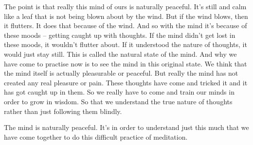 The point is that really this mind of ours is naturally peaceful. It's still and calm like a leaf that is not being blown about by the wind. But if the wind blows, then it flutters. It does that because of the wind. And so with the mind it's because of these moods -- getting caught up with thoughts. If the mind didn't get lost in these moods, it wouldn't flutter about. If it understood the nature of thoughts, it would just stay still. This is called the natural state of the mind. And why we have come to practise now is to see the mind in this original state. We think that the mind itself is actually pleasurable or peaceful. But really the mind has not created any real pleasure or pain. These thoughts have come and tricked it and it has got caught up in them. So we really have to come and train our minds in order to grow in wisdom. So that we understand the true nature of thoughts rather than just following them blindly.

The mind is naturally peaceful. It's in order to understand just this much that we have come together to do this difficult practice of meditation.

